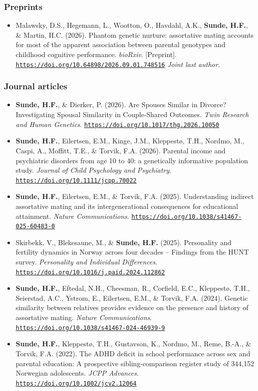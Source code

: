 \documentclass[10pt,a4paper]{article}
\let\cvhref\href
\renewcommand{\href}[2]{\cvhref{#1}{\underline{#2}}}%
\renewcommand{\url}[1]{\href{#1}{\nolinkurl{#1}}}%
\begin{document}
\subsubsection*{Preprints}
\begin{itemize}
\item Malawsky, D.S., Hegemann, L., Wootton, O., Havdahl, A.K., \textbf{Sunde, H.F.}, \& Martin, H.C. (2026). Phantom genetic nurture: assortative mating accounts for most of the apparent association between parental genotypes and childhood cognitive performance. \textit{bioRxiv}. [Preprint]. \url{https://doi.org/10.64898/2026.09.01.748516} \textit{Joint last author.}
\end{itemize}
\subsubsection*{Journal articles}
\begin{itemize}
\item \textbf{Sunde, H.F.}, \& Dierker, P. (2026). Are Spouses Similar in Divorce? Investigating Spousal Similarity in Couple-Shared Outcomes. \textit{Twin Research and Human Genetics}. \url{https://doi.org/10.1017/thg.2026.10050}
\item \textbf{Sunde, H.F.}, Eilertsen, E.M., Kinge, J.M., Kleppestø, T.H., Nordmo, M., Caspi, A., Moffitt, T.E., \& Torvik, F.A. (2026). Parental income and psychiatric disorders from age 10 to 40: a genetically informative population study. \textit{Journal of Child Psychology and Psychiatry}. \url{https://doi.org/10.1111/jcpp.70022}
\item \textbf{Sunde, H.F.}, Eilertsen, E.M., \& Torvik, F.A. (2025). Understanding indirect assortative mating and its intergenerational consequences for educational attainment. \textit{Nature Communications}. \url{https://doi.org/10.1038/s41467-025-60483-0}
\item Skirbekk, V., Blekesaune, M., \& \textbf{Sunde, H.F.} (2025). Personality and fertility dynamics in Norway across four decades -- Findings from the HUNT survey. \textit{Personality and Individual Differences}. \url{https://doi.org/10.1016/j.paid.2024.112862}
\item \textbf{Sunde, H.F.}, Eftedal, N.H., Cheesman, R., Corfield, E.C., Kleppestø, T.H., Seierstad, A.C., Ystrom, E., Eilertsen, E.M., \& Torvik, F.A. (2024). Genetic similarity between relatives provides evidence on the presence and history of assortative mating. \textit{Nature Communications}. \url{https://doi.org/10.1038/s41467-024-46939-9}
\item \textbf{Sunde, H.F.}, Kleppestø, T.H., Gustavson, K., Nordmo, M., Reme, B.-A., \& Torvik, F.A. (2022). The ADHD deficit in school performance across sex and parental education: A prospective sibling-comparison register study of 344,152 Norwegian adolescents. \textit{JCPP Advances}. \url{https://doi.org/10.1002/jcv2.12064}
\end{itemize}
\end{document}
